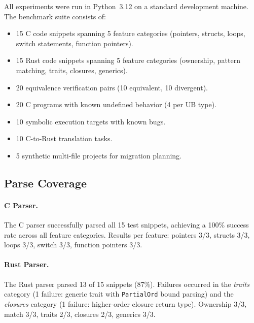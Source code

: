\documentclass[11pt,a4paper]{article}
\begin{document}
All experiments were run in Python~3.12 on a standard development
machine. The benchmark suite consists of:
\begin{itemize}
  \item 15 C code snippets spanning 5 feature categories (pointers,
    structs, loops, switch statements, function pointers).
  \item 15 Rust code snippets spanning 5 feature categories (ownership,
    pattern matching, traits, closures, generics).
  \item 20 equivalence verification pairs (10 equivalent, 10 divergent).
  \item 20 C programs with known undefined behavior (4 per UB type).
  \item 10 symbolic execution targets with known bugs.
  \item 10 C-to-Rust translation tasks.
  \item 5 synthetic multi-file projects for migration planning.
\end{itemize}

\subsection{Parse Coverage}\label{sec:exp-parse}

\paragraph{C Parser.} The C parser successfully parsed all 15 test
snippets, achieving a 100\% success rate across all feature categories.
Results per feature: pointers 3/3, structs 3/3, loops 3/3,
switch 3/3, function pointers 3/3.

\paragraph{Rust Parser.} The Rust parser parsed 13 of 15 snippets
(87\%). Failures occurred in the \emph{traits} category (1 failure:
generic trait with \texttt{PartialOrd} bound parsing) and the
\emph{closures} category (1 failure: higher-order closure return type).
Ownership 3/3, match 3/3, traits 2/3, closures 2/3, generics 3/3.
\end{document}

